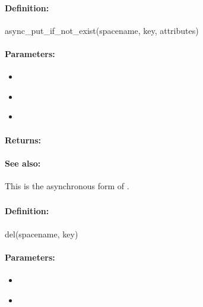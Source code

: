 \paragraph{Definition:}
\begin{rubycode}
async_put_if_not_exist(spacename, key, attributes)
\end{rubycode}

\paragraph{Parameters:}
\begin{itemize}[noitemsep]
\item {}\\

\item {}\\

\item {}\\

\end{itemize}

\paragraph{Returns:}


\paragraph{See also:}  This is the asynchronous form of .

\pagebreak
\subsubsection{}
\label{api:ruby:del}


\paragraph{Definition:}
\begin{rubycode}
del(spacename, key)
\end{rubycode}

\paragraph{Parameters:}
\begin{itemize}[noitemsep]
\item {}\\

\item {}\\

\end{itemize}

